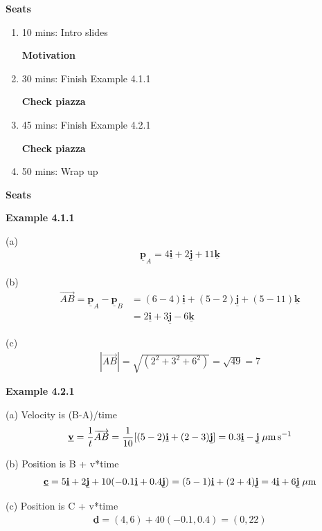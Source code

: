 \textbf{Seats}
\begin{enumerate}
    \item 10 mins: Intro slides \par
    \textbf{Motivation}
    \item 30 mins: Finish Example 4.1.1 \par
    \textbf{Check piazza}
    \item 45 mins: Finish Example 4.2.1 \par
    \textbf{Check piazza}
    \item 50 mins: Wrap up \par
\end{enumerate}
\textbf{Seats}

\newcommand{\vect}[1]{\underline{\mathbf{#1}}}

\vspace{5mm} 
\textbf{Example 4.1.1} \par

(a)
\begin{align*}
\vect{p}_A = 4\vect{i} + 2\vect{j} + 11\vect{k}
\end{align*}

(b)
\begin{align*}
\overrightarrow{AB} = \vect{p}_A - \vect{p}_B &= (6-4)\vect{i} + (5-2)\vect{j} + (5-11)\vect{k}\\
&= 2\vect{i} + 3\vect{j} - 6\vect{k}
\end{align*}

(c)
\begin{align*}
|\overrightarrow{AB}| = \sqrt{\left(2^2 + 3^2 + 6^2\right)} = \sqrt{49} = 7
\end{align*}

\vspace{5mm} 
\textbf{Example 4.2.1} \par

(a) Velocity is (B-A)/time
\begin{align*}
\vect{v} = \frac{1}{t}\overrightarrow{AB} = \frac{1}{10}[(5-2)\vect{i} + (2-3)\vect{j}] = 0.3\vect{i}-\vect{j} \; \mu{\rm m \, s}^{-1}
\end{align*}

(b) Position is B + v*time
\begin{align*}
\vect{c} = 5\vect{i} + 2\vect{j} + 10(-0.1\vect{i} + 0.4\vect{j}) = (5-1)\vect{i} + (2 + 4)\vect{j} = 4\vect{i} + 6\vect{j} \; \mu {\rm m}
\end{align*}

(c) Position is C + v*time
\begin{align*}
    \vect{d} = (4,6) + 40(-0.1,0.4) = (0, 22)
\end{align*}


